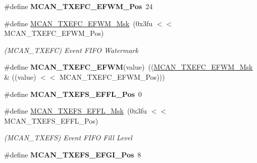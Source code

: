 \begin{DoxyCompactItemize}
\mbox{\label{group__SAMV71__MCAN_gadfc8d3f72d01a93a0115adf3bb9ba4bc}} 
\#define {\bfseries M\+C\+A\+N\+\_\+\+T\+X\+E\+F\+C\+\_\+\+E\+F\+W\+M\+\_\+\+Pos}~24
\item 
\mbox{\label{group__SAMV71__MCAN_gaa36619414e89fe499b60b3a103b48b17}} 
\#define \mbox{\hyperlink{group__SAMV71__MCAN_gaa36619414e89fe499b60b3a103b48b17}{M\+C\+A\+N\+\_\+\+T\+X\+E\+F\+C\+\_\+\+E\+F\+W\+M\+\_\+\+Msk}}~(0x3fu $<$$<$ M\+C\+A\+N\+\_\+\+T\+X\+E\+F\+C\+\_\+\+E\+F\+W\+M\+\_\+\+Pos)
\begin{DoxyCompactList}\small\item\em (M\+C\+A\+N\+\_\+\+T\+X\+E\+FC) Event F\+I\+FO Watermark \end{DoxyCompactList}\item 
\mbox{\label{group__SAMV71__MCAN_gafbff28f94674b1c43061d5cc39a4454e}} 
\#define {\bfseries M\+C\+A\+N\+\_\+\+T\+X\+E\+F\+C\+\_\+\+E\+F\+WM}(value)~((\mbox{\hyperlink{group__SAMV71__MCAN_gaa36619414e89fe499b60b3a103b48b17}{M\+C\+A\+N\+\_\+\+T\+X\+E\+F\+C\+\_\+\+E\+F\+W\+M\+\_\+\+Msk}} \& ((value) $<$$<$ M\+C\+A\+N\+\_\+\+T\+X\+E\+F\+C\+\_\+\+E\+F\+W\+M\+\_\+\+Pos)))
\item 
\mbox{\label{group__SAMV71__MCAN_gad0cb8dd5787b1f3fc37887d9b2c00d2d}} 
\#define {\bfseries M\+C\+A\+N\+\_\+\+T\+X\+E\+F\+S\+\_\+\+E\+F\+F\+L\+\_\+\+Pos}~0
\item 
\mbox{\label{group__SAMV71__MCAN_gab2dee7c2966bd9fad283289f57a04df6}} 
\#define \mbox{\hyperlink{group__SAMV71__MCAN_gab2dee7c2966bd9fad283289f57a04df6}{M\+C\+A\+N\+\_\+\+T\+X\+E\+F\+S\+\_\+\+E\+F\+F\+L\+\_\+\+Msk}}~(0x3fu $<$$<$ M\+C\+A\+N\+\_\+\+T\+X\+E\+F\+S\+\_\+\+E\+F\+F\+L\+\_\+\+Pos)
\begin{DoxyCompactList}\small\item\em (M\+C\+A\+N\+\_\+\+T\+X\+E\+FS) Event F\+I\+FO Fill Level \end{DoxyCompactList}\item 
\mbox{\label{group__SAMV71__MCAN_ga9f2bf203635ee5b50696346a31c63131}} 
\#define {\bfseries M\+C\+A\+N\+\_\+\+T\+X\+E\+F\+S\+\_\+\+E\+F\+G\+I\+\_\+\+Pos}~8
\item 
\mbox{\label{group__SAMV71__MCAN_gaea6b410c94a0b27a83fab203e42f5feb}} 
$$
\end{DoxyCompactItemize}
